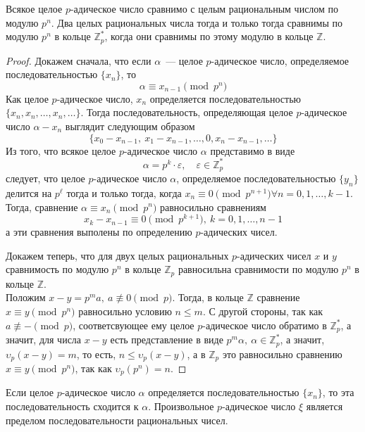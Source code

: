 \documentclass[11pt]{article}
\begin{document}
    \begin{theorem}
        Всякое целое $p$-адическое число сравнимо с целым рациональным числом по модулю $p^n$. Два целых рациональных числа тогда и только тогда сравнимы по модулю
        $p^n$ в кольце $\mathbb{Z}_p^{*}$, когда они сравнимы по этому модулю в кольце $\mathbb{Z}$.
    \end{theorem}
    \begin{proof}
        Докажем сначала, что если $\alpha$~--- целое $p$-адическое число, определяемое последовательностью $\{ x_n \}$, то
        \[ \alpha \equiv x_{n - 1} \pmod{p^n} \]
        Как целое $p$-адическое число, $x_n$  определяется последовательностью $\{ x_n, x_n, \ldots, x_n, \ldots \}$. Тогда последовательность, определяющая целое $p$-адическое число
        $\alpha - x_n$ выглядит следующим образом
        \[ \{ x_0 - x_{n - 1}, \ x_1 - x_{n - 1}, \ldots, 0, x_n - x_{n - 1}, \ldots \}\]
        Из того, что всякое целое $p$-адическое число $\alpha$ представимо в виде
        \[ \alpha = p^k \cdot \varepsilon, \quad \varepsilon \in \mathbb{Z}_p^{*}\]
        следует, что целое $p$-адическое число $\alpha$, определяемое последовательностью $\{ y_n \}$ делится на $p^{\ell}$ тогда и только тогда, когда
        $x_n \equiv 0 \pmod{p^{n + 1}} \forall n = 0, 1, \ldots, k - 1$.
        Тогда, сравнение  $\alpha \equiv x_n \pmod{p^n}$ равносильно сравнениям
        \[ x_k - x_{n - 1} \equiv 0 \pmod{p^{k + 1}}, \ k = 0, 1, \ldots, n - 1\]
        а эти сравнения выполены по определению $p$-адических чисел.

        Докажем теперь, что для двух целых рациональных $p$-адических чисел $x$ и $y$ сравнимость по модулю $p^n$ в кольце $\mathbb{Z}_p$ равносильна
        сравнимости по модулю $p^n$ в кольце $\mathbb{Z}$.\\
        Положим $x - y = p^m a, \ a \not\equiv 0 \pmod{p} $. Тогда, в кольце $\mathbb{Z}$ сравнение $x \equiv y \pmod{p^n}$ равносильно условию $n \le m$.
        С другой стороны, так как $a \not\equiv - \pmod{p}$, соответсвующее ему целое $p$-адическое число обратимо в $\mathbb{Z}_p^{*}$, а значит, для числа
        $x - y$ есть представление в виде $p^m \alpha, \ \alpha \in \mathbb{Z}_p^{*}$, а значит, $ \upsilon_p{(x - y)} = m$, то есть, $n \le \upsilon_p{(x - y)}$,
        а в $\mathbb{Z}_p$ это равносильно сравнению $x \equiv y \pmod{p^n}$, так как $ \upsilon_p{(p^n)} = n$.
    \end{proof}
    \begin{theorem}
        Если целое $p$-адическое число $\alpha$ определяется последовательностью $\{ x_n \}$, то эта последовательность сходится к $\alpha$. Произвольное $p$-адическое число
        $\xi$ является пределом последовательности рациональных чисел.
    \end{theorem}
\end{document}
